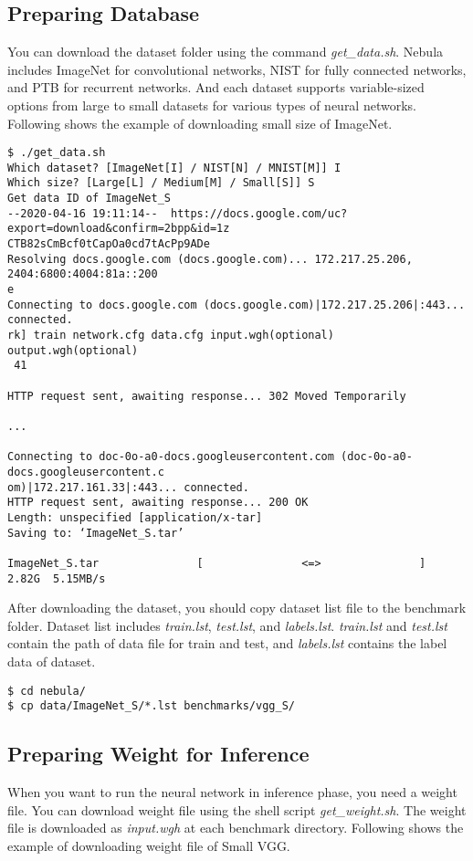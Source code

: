\documentclass[10pt]{article}
\begin{document}
\subsection{Preparing Database} \label{subsec:database}
You can download the dataset folder using the command \emph{get\_data.sh}.
Nebula includes ImageNet for convolutional networks, NIST for fully connected networks, and PTB for recurrent networks.
And each dataset supports variable-sized options from large to small datasets for various types of neural networks. 
Following shows the example of downloading small size of ImageNet.

\begin{Verbatim}[frame=single,fontsize=\small]
$ ./get_data.sh
Which dataset? [ImageNet[I] / NIST[N] / MNIST[M]] I
Which size? [Large[L] / Medium[M] / Small[S]] S
Get data ID of ImageNet_S
--2020-04-16 19:11:14--  https://docs.google.com/uc?export=download&confirm=2bpp&id=1z
CTB82sCmBcf0tCapOa0cd7tAcPp9ADe
Resolving docs.google.com (docs.google.com)... 172.217.25.206, 2404:6800:4004:81a::200
e
Connecting to docs.google.com (docs.google.com)|172.217.25.206|:443... connected.
rk] train network.cfg data.cfg input.wgh(optional) output.wgh(optional)
 41 

HTTP request sent, awaiting response... 302 Moved Temporarily

...

Connecting to doc-0o-a0-docs.googleusercontent.com (doc-0o-a0-docs.googleusercontent.c
om)|172.217.161.33|:443... connected.
HTTP request sent, awaiting response... 200 OK
Length: unspecified [application/x-tar]
Saving to: ‘ImageNet_S.tar’

ImageNet_S.tar               [               <=>               ]   2.82G  5.15MB/s  

\end{Verbatim}

After downloading the dataset, you should copy dataset list file to the benchmark folder.
Dataset list includes \emph{train.lst}, \emph{test.lst}, and \emph{labels.lst}.
\emph{train.lst} and \emph{test.lst} contain the path of data file for train and test, and \emph{labels.lst} contains the label data of dataset.

\begin{Verbatim}[frame=single,fontsize=\small]
$ cd nebula/
$ cp data/ImageNet_S/*.lst benchmarks/vgg_S/
\end{Verbatim}

\subsection{Preparing Weight for Inference} \label{subsec:weight}
When you want to run the neural network in inference phase, you need a weight file.
You can download weight file using the shell script \emph{get\_weight.sh}.
The weight file is downloaded as \emph{input.wgh} at each benchmark directory.
Following shows the example of downloading weight file of Small VGG.
\end{document}
